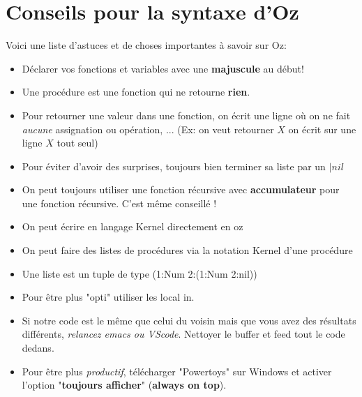 \documentclass{report}
\begin{document}
\chapter{Conseils pour la syntaxe d'Oz}
Voici une liste d'astuces et de choses importantes à savoir sur Oz:
\begin{itemize}
\item Déclarer vos fonctions et variables avec une \textbf{majuscule} au début!
\item Une procédure est une fonction qui ne retourne \textbf{rien}.
\item Pour retourner une valeur dans une fonction, on écrit une ligne où on ne fait \textit{aucune} assignation ou opération, ... (Ex: on veut retourner $X$ on écrit sur une ligne $X$ tout seul)
\item Pour éviter d'avoir des surprises, toujours bien terminer sa liste par un $| nil$
\item On peut toujours utiliser une fonction récursive avec \textbf{accumulateur} pour une fonction récursive. C'est même conseillé !
\item On peut écrire en langage Kernel directement en oz
\item On peut faire des listes de procédures via la notation Kernel d'une procédure
\item Une liste est un tuple de type (1:Num 2:(1:Num 2:nil))
\item Pour être plus "opti" utiliser les local in.
\item Si notre code est le même que celui du voisin mais que vous avez des résultats différents, \textit{relancez emacs ou VScode}. Nettoyer le buffer et feed tout le code dedans.
\item Pour être plus \textit{productif}, télécharger "Powertoys" sur Windows et activer l'option "\textbf{toujours afficher}" (\textbf{always on top}).
\end{itemize}
\end{document}
